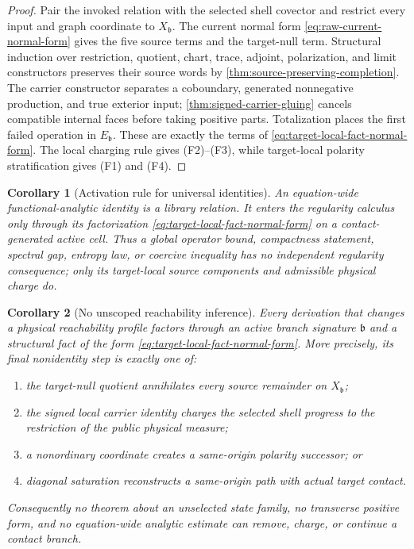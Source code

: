 \documentclass[11pt]{article}
\numberwithin{section}{part}
\theoremstyle{plain}
\newtheorem{corollary}[corollary]{Corollary}
\theoremstyle{definition}
\theoremstyle{remark}
\begin{document}
\begin{proof}
Pair the invoked relation with the selected shell covector and restrict every
input and graph coordinate to \(X_{\mathfrak b}\).  The current normal form
\eqref{eq:raw-current-normal-form} gives the five source terms and the
target-null term.  Structural induction over restriction, quotient, chart,
trace, adjoint, polarization, and limit constructors preserves their source
words by \cref{thm:source-preserving-completion}.  The carrier constructor
separates a coboundary, generated nonnegative production, and true exterior
input; \cref{thm:signed-carrier-gluing} cancels compatible internal faces
before taking positive parts.  Totalization places the first failed operation
in \(E_{\mathfrak b}\).  These are exactly the terms of
\eqref{eq:target-local-fact-normal-form}.  The local charging rule gives
\textup{(F2)}--\textup{(F3)}, while target-local polarity stratification gives
\textup{(F1)} and \textup{(F4)}.
\end{proof}

\begin{corollary}[Activation rule for universal identities]
\label{cor:target-local-identity-activation}
An equation-wide functional-analytic identity is a library relation.  It
enters the regularity calculus only through its factorization
\eqref{eq:target-local-fact-normal-form} on a contact-generated active cell.
Thus a global operator bound, compactness statement, spectral gap, entropy
law, or coercive inequality has no independent regularity consequence; only
its target-local source components and admissible physical charge do.
\end{corollary}

\begin{corollary}[No unscoped reachability inference]
\label{cor:no-unscoped-reachability-inference}
Every derivation that changes a physical reachability profile factors through
an active branch signature \(\mathfrak b\) and a structural fact of the form
\eqref{eq:target-local-fact-normal-form}.  More precisely, its final
nonidentity step is exactly one of:
\begin{enumerate}[label=\textup{(R\arabic*)}]
\item the target-null quotient annihilates every source remainder on
  \(X_{\mathfrak b}\);
\item the signed local carrier identity charges the selected shell progress
  to the restriction of the public physical measure;
\item a nonordinary coordinate creates a same-origin polarity successor; or
\item diagonal saturation reconstructs a same-origin path with actual target
  contact.
\end{enumerate}
Consequently no theorem about an unselected state family, no transverse
positive form, and no equation-wide analytic estimate can remove, charge, or
continue a contact branch.
\end{corollary}
\end{document}
